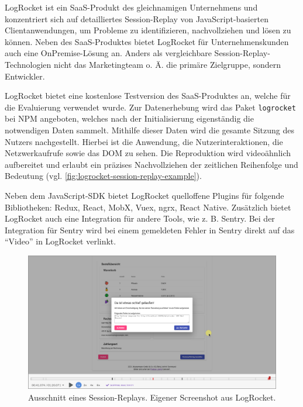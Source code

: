 LogRocket \cite{LogRocket} ist ein SaaS-Produkt des gleichnamigen Unternehmens und konzentriert sich auf detailliertes Session-Replay von JavaScript-basierten Clientanwendungen, um Probleme zu identifizieren, nachvollziehen und lösen zu können. Neben des SaaS-Produktes bietet LogRocket für Unternehmenskunden auch eine OnPremise-Lösung an. Anders als vergleichbare Session-Replay-Technologien nicht das Marketingteam o. Ä. \cite{Webalyt} die primäre Zielgruppe, sondern Entwickler.

LogRocket bietet eine kostenlose Testversion des SaaS-Produktes an, welche für die Evaluierung verwendet wurde. Zur Datenerhebung wird das Paket \texttt{logrocket} bei NPM \cite{NPM} angeboten, welches nach der Initialisierung eigenständig die notwendigen Daten sammelt. Mithilfe dieser Daten wird die gesamte Sitzung des Nutzers nachgestellt. Hierbei ist die Anwendung, die Nutzerinteraktionen, die Netzwerkaufrufe sowie das DOM zu sehen. Die Reproduktion wird videoähnlich aufbereitet und erlaubt ein präzises Nachvollziehen der zeitlichen Reihenfolge und Bedeutung (vgl. \autoref{fig:logrocket-session-replay-example}).

Neben dem JavaScript-SDK bietet LogRocket quelloffene Plugins für folgende Bibliotheken: Redux, React, MobX, Vuex, ngrx, React Native. Zusätzlich bietet LogRocket auch eine Integration für andere Tools, wie z. B. Sentry. Bei der Integration für Sentry wird bei einem gemeldeten Fehler in Sentry direkt auf das \enquote{Video} in LogRocket verlinkt.

\begin{figure}[H]
	\centering
	\includegraphics[width=\linewidth]{img/03_methoden/logrocket_session-replay-example-cropped.png}
	\caption{Ausschnitt eines Session-Replays. Eigener Screenshot aus LogRocket.}
	\label{fig:logrocket-session-replay-example}
\end{figure}
